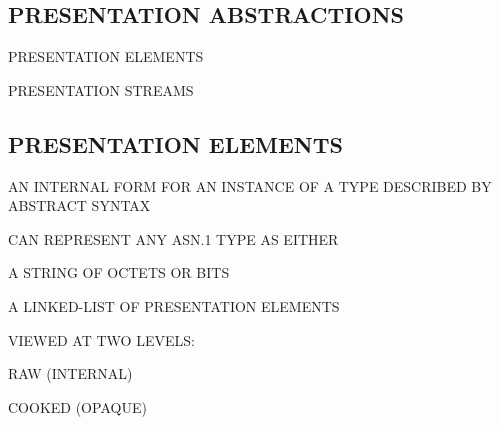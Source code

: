 \begin{bwslide}
\part	{PRESENTATION ABSTRACTIONS}\bf

\begin{nrtc}
\item	PRESENTATION ELEMENTS

\item	PRESENTATION STREAMS
\end{nrtc}
\end{bwslide}


\begin{bwslide}
\part*	{PRESENTATION ELEMENTS}\bf

\begin{nrtc}
\item	AN INTERNAL FORM FOR AN INSTANCE OF A TYPE DESCRIBED BY ABSTRACT
	SYNTAX

\item	CAN REPRESENT ANY ASN.1 TYPE AS EITHER
    \begin{nrtc}
    \item	A STRING OF OCTETS OR BITS

    \item	A LINKED-LIST OF PRESENTATION ELEMENTS
    \end{nrtc}

\item	VIEWED AT TWO LEVELS:
    \begin{nrtc}
    \item	RAW (INTERNAL)

    \item	COOKED (OPAQUE)
    \end{nrtc}
\end{nrtc}
\end{bwslide}


